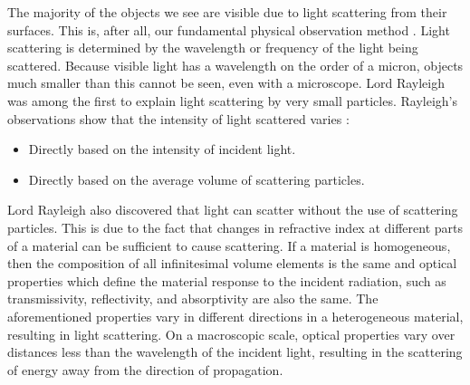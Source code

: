 The majority of the objects we see are visible due to light scattering from their surfaces.  This is, after all, our fundamental physical observation method \cite{Kerker1969TheSO}. Light scattering is determined by the wavelength or frequency of the light being scattered. Because visible light has a wavelength on the order of a micron, objects much smaller than this cannot be seen, even with a microscope. Lord Rayleigh was among the first to explain light scattering by very
small particles. Rayleigh's observations show that the intensity of light scattered varies \cite{choudhury2014principles}:
\begin{itemize}
    \item Directly based on the intensity of incident light.
    \item Directly based on the average volume of scattering particles.
\end{itemize}
Lord Rayleigh also discovered that light can scatter without the use of scattering particles. This is due to the fact that changes in refractive index at different parts of a material can be sufficient to cause scattering. If a material is homogeneous, then the composition of all infinitesimal volume elements is the same and optical properties which define the material response to the incident radiation, such as transmissivity, reflectivity, and absorptivity are also the same. The aforementioned properties vary in different directions in a heterogeneous material, resulting in light scattering. On a macroscopic scale, optical properties vary over distances less than the wavelength of the incident light, resulting in the scattering of energy away from the direction of propagation. 

